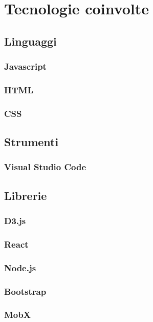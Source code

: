 \section{Tecnologie coinvolte}
\subsection{Linguaggi}
\subsubsection{Javascript}

\subsubsection{HTML}

\subsubsection{CSS}

\subsection{Strumenti}
\subsubsection{Visual Studio Code}

\subsection{Librerie}
\subsubsection{D3.js}

\subsubsection{React}

\subsubsection{Node.js}

\subsubsection{Bootstrap}

\subsubsection{MobX}